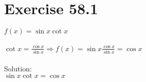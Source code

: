 \documentclass[a4paper, 10pt]{scrartcl}
\begin{document}
\section{Exercise 58.1}

$f(x) = \sin{x} \cot{x}$\\
\\
$\cot{x} = \frac{\cos{x}}{\sin{x}} \Rightarrow f(x) = \sin{x} \frac{\cos{x}}{\sin{x}} = \cos{x}$
\\
\\
Solution:\\
$\sin{x} \cot{x} = \cos{x}$
\end{document}
